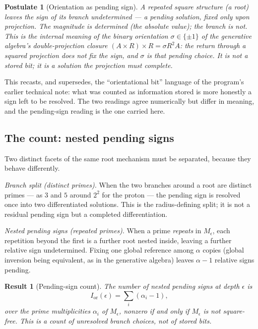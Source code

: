\documentclass[11pt,a4paper]{article}
\newtheorem{theorem}{Result}
\newtheorem{postulate}{Postulate}
\newcommand{\Ior}{I_{\mathrm{or}}}
\begin{document}
\begin{postulate}[Orientation as pending sign]\label{post:orient}
A repeated square structure (a root) leaves the sign of its branch undetermined --- a pending solution, fixed only upon projection. The magnitude is determined (the absolute value); the branch is not. This is the internal meaning of the binary orientation $\sigma\in\{\pm1\}$ of the generative algebra's double-projection closure $(A\times R)\times R=\sigma R^2A$: the return through a squared projection does not fix the sign, and $\sigma$ is that pending choice. It is not a stored bit; it is a solution the projection must complete.
\end{postulate}

This recasts, and supersedes, the ``orientational bit'' language of the program's earlier technical note: what was counted as information stored is more honestly a sign left to be resolved. The two readings agree numerically but differ in meaning, and the pending-sign reading is the one carried here.

\subsection{The count: nested pending signs}
Two distinct facets of the same root mechanism must be separated, because they behave differently.

\emph{Branch split (distinct primes).} When the two branches around a root are distinct primes --- as $3$ and $5$ around $2^2$ for the proton --- the pending sign is resolved once into two differentiated solutions. This is the radius-defining split; it is not a residual pending sign but a completed differentiation.

\emph{Nested pending signs (repeated primes).} When a prime \emph{repeats} in $M_\epsilon$, each repetition beyond the first is a further root nested inside, leaving a further relative sign undetermined. Fixing one global reference among $\alpha$ copies (global inversion being equivalent, as in the generative algebra) leaves $\alpha-1$ relative signs pending.

\begin{theorem}[Pending-sign count]\label{res:ior}
The number of nested pending signs at depth $\epsilon$ is
\[
\Ior(\epsilon)=\sum_i(\alpha_i-1),
\]
over the prime multiplicities $\alpha_i$ of $M_\epsilon$, nonzero if and only if $M_\epsilon$ is not square-free. This is a count of unresolved branch choices, not of stored bits.
\end{theorem}
\end{document}
